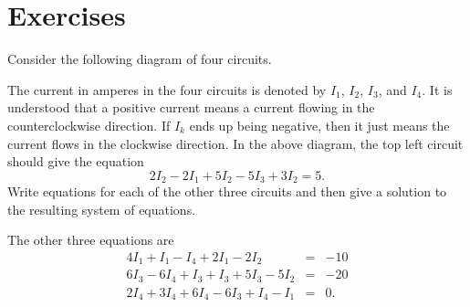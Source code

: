 \section*{Exercises}

\begin{enumialphparenastyle}

\begin{ex} Consider the following diagram of four circuits.
  \begin{center}
  \end{center}
  The current in amperes in the four circuits is denoted by $I_{1}$,
  $I_{2}$, $I_{3}$, and $I_{4}$. It is understood that a positive
  current means a current flowing in the counterclockwise direction. If
  $I_{k}$ ends up being negative, then it just means the current flows
  in the clockwise direction.  In the above diagram, the top left
  circuit should give the equation
  \begin{equation*}
    2I_{2}-2I_{1}+5I_{2}-5I_{3}+3I_{2}=5.
  \end{equation*}
  Write equations for each of the other three circuits and then give a solution
  to the resulting system of equations. 
  \begin{sol}
    The other three equations are
    \begin{eqnarray*}
      4I_{1}+I_{1}-I_{4}+2I_{1}-2I_{2} &=& -10 \\
      6I_{3}-6I_{4}+I_{3}+I_{3}+5I_{3}-5I_{2} &=&-20 \\
      2I_{4}+3I_{4}+6I_{4}-6I_{3}+I_{4}-I_{1} &=&0.

\end{eqnarray*}
\end{sol}
\end{ex}
\end{enumialphparenastyle}
